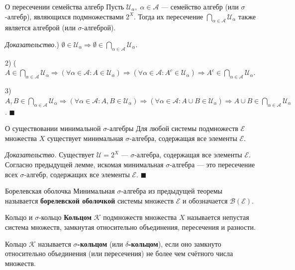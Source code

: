\documentclass[12pt,a4paper]{article}
\newenvironment{Proof}[1][Доказательство]{\vspace{0.5em}\noindent\textit{#1.}\hspace{0.5em}\ignorespaces}{\hfill$\blacksquare$\vspace{1em}}
\begin{document}
\begin{Lemma}{О пересечении семейства алгебр}{}
Пусть $\mathcal{U}_\alpha, \; \alpha \in \mathcal{A}$ — семейство алгебр (или $\sigma$-алгебр), являющихся подмножествами $2^X$. Тогда их пересечение $\bigcap\limits_{\alpha \in \mathcal{A}} \mathcal{U}_\alpha$ также является алгеброй (или $\sigma$-алгеброй).
\end{Lemma}

\begin{Proof}
1) $\emptyset \in \mathcal{U}_\alpha \Rightarrow \emptyset \in \bigcap\limits_{\alpha \in \mathcal{A}} \mathcal{U}_\alpha$.

2) ($A \in \bigcap\limits_{\alpha \in \mathcal{A}} \mathcal{U}_\alpha \Rightarrow (\forall \alpha \in \mathcal{A} : A \in \mathcal{U}_\alpha) \Rightarrow (\forall \alpha \in \mathcal{A} : A^c \in \mathcal{U}_\alpha) \Rightarrow A^c \in \bigcap\limits_{\alpha \in \mathcal{A}} \mathcal{U}_\alpha$.

3) $A, B \in \bigcap\limits_{\alpha \in \mathcal{A}} \mathcal{U}_\alpha \Rightarrow (\forall \alpha \in \mathcal{A} : A, B \in \mathcal{U}_\alpha) \Rightarrow (\forall \alpha \in \mathcal{A} : A \cup B \in \mathcal{U}_\alpha) \Rightarrow A \cup B \in \bigcap\limits_{\alpha \in \mathcal{A}} \mathcal{U}_\alpha$.
\end{Proof}

\begin{Theorem}{О существовании минимальной $\sigma$-алгебры}{}
Для любой системы подмножеств $\mathcal{E}$ множества $X$ существует минимальная $\sigma$-алгебра, содержащая все элементы $\mathcal{E}$.
\end{Theorem}

\begin{Proof}
Существует $\mathcal{U} = 2^X$ — $\sigma$-алгебра, содержащая все элементы $\mathcal{E}$. Согласно предыдущей лемме, искомая минимальная $\sigma$-алгебра — это пересечение всех $\sigma$-алгебр, содержащих все элементы $\mathcal{E}$.
\end{Proof}

\begin{Definition}{Борелевская оболочка}{}
Минимальная $\sigma$-алгебра из предыдущей теоремы называется \textbf{борелевской оболочкой} системы множеств $\mathcal{E}$ и обозначается $\mathcal{B}(\mathcal{E})$.
\end{Definition}


\begin{Definition}{Кольцо и $\sigma$-кольцо}{}
\textbf{Кольцом} $\mathcal{K}$ подмножеств множества $X$ называется непустая система множеств, замкнутая относительно объединения, пересечения и разности.

Кольцо $\mathcal{K}$ называется \textbf{$\sigma$-кольцом} (или \textbf{$\delta$-кольцом}), если оно замкнуто относительно объединения (или пересечения) не более чем счётного числа множеств.
\end{Definition}
\end{document}
